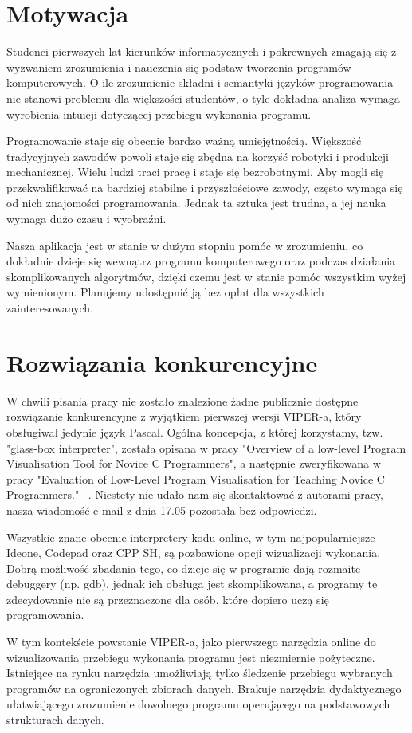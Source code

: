 \documentclass[a4paper,twoside,openright,11pt]{report}
\begin{document}
  \section{Motywacja}
\par Studenci pierwszych lat kierunków informatycznych i pokrewnych zmagają się z wyzwaniem zrozumienia i nauczenia się podstaw tworzenia programów komputerowych. O ile zrozumienie składni i semantyki języków programowania nie stanowi problemu dla większości studentów, o tyle dokładna analiza wymaga wyrobienia intuicji dotyczącej przebiegu wykonania programu.
\par Programowanie staje się obecnie bardzo ważną umiejętnością. Większość tradycyjnych zawodów powoli staje się zbędna na korzyść robotyki i produkcji mechanicznej. Wielu ludzi traci pracę i staje się bezrobotnymi. Aby mogli się przekwalifikować na bardziej stabilne i przyszłościowe zawody, często wymaga się od nich znajomości programowania. Jednak ta sztuka jest trudna, a jej nauka wymaga dużo czasu i wyobraźni. 
\par Nasza aplikacja jest w stanie w dużym stopniu pomóc w zrozumieniu, co dokładnie dzieje się wewnątrz programu komputerowego oraz podczas działania skomplikowanych algorytmów, dzięki czemu jest w stanie pomóc wszystkim wyżej wymienionym. Planujemy udostępnić ją bez opłat dla wszystkich zainteresowanych.

  \section{Rozwiązania konkurencyjne}
\par W chwili pisania pracy nie zostało znalezione żadne publicznie dostępne rozwiązanie konkurencyjne z wyjątkiem pierwszej wersji VIPER-a, który obsługiwał jedynie język Pascal. Ogólna koncepcja, z której korzystamy, tzw. "glass-box interpreter", została opisana w pracy "Overview of a low-level Program Visualisation Tool for Novice C Programmers"\cite{overview-vistool}, a następnie zweryfikowana w pracy "Evaluation of Low-Level Program Visualisation for Teaching Novice C Programmers." ~\cite{evaluation-vistool}. Niestety nie udało nam się skontaktować z autorami pracy, nasza wiadomość e-mail z dnia 17.05 pozostała bez odpowiedzi.
\par Wszystkie znane obecnie interpretery kodu online, w tym najpopularniejsze - Ideone, Codepad oraz CPP SH, są pozbawione opcji wizualizacji wykonania. Dobrą możliwość zbadania tego, co dzieje się w programie dają rozmaite debuggery (np. gdb), jednak ich obsługa jest skomplikowana, a programy te zdecydowanie nie są przeznaczone dla osób, które dopiero uczą się programowania.
\par W tym kontekście powstanie VIPER-a, jako pierwszego narzędzia online do wizualizowania przebiegu wykonania programu jest niezmiernie pożyteczne. Istniejące na rynku narzędzia umożliwiają tylko śledzenie przebiegu wybranych programów na ograniczonych zbiorach danych. Brakuje narzędzia dydaktycznego ułatwiającego zrozumienie dowolnego programu operującego na podstawowych strukturach danych. 
\end{document}
